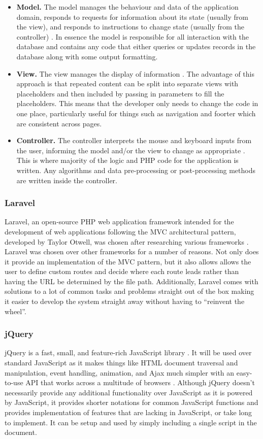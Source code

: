 \begin{itemize}
	\item \textbf{Model.} The model manages the behaviour and data of the application domain, responds to requests for information about its state (usually from the view), and responds to instructions to change state (usually from the controller) \cite{MSDN:MVC}. In essence the model is responsible for all interaction with the database and contains any code that either queries or updates records in the database along with some output formatting.
	\item \textbf{View.} The view manages the display of information \cite{MSDN:MVC}. The advantage of this approach is that repeated content can be split into separate views with placeholders and then included by passing in parameters to fill the placeholders. This means that the developer only needs to change the code in one place, particularly useful for things such as navigation and foorter which are consistent across pages.
	\item \textbf{Controller.} The controller interprets the mouse and keyboard inputs from the user, informing the model and/or the view to change as appropriate \cite{MSDN:MVC}. This is where majority of the logic and PHP code for the application is written. Any algorithms and data pre-processing or post-processing methods are written inside the controller.
\end{itemize}

\subsubsection{Laravel}
Laravel, an open-source PHP web application framework intended for the development of web applications following the MVC architectural pattern, developed by Taylor Otwell, was chosen after researching various frameworks \cite{Laravel:Home}. Laravel was chosen over other frameworks for a number of reasons. Not only does it provide an implementation of the MVC pattern, but it also allows allows the user to define custom routes and decide where each route leads rather than having the URL be determined by the file path. Additionally, Laravel comes with solutions to a lot of common tasks and problems straight out of the box making it easier to develop the system straight away without having to ``reinvent the wheel''.

\subsubsection{jQuery} 
jQuery is a fast, small, and feature-rich JavaScript library \cite{jQuery:Home}. It will be used over standard JavaScript as it makes things like HTML document traversal and manipulation, event handling, animation, and Ajax much simpler with an easy-to-use API that works across a multitude of browsers \cite{jQuery:Home}. Although jQuery doesn't necessarily provide any additional functionality over JavaScript as it is powered by JavaScript, it provides shorter notations for common JavaScript functions and provides implementation of features that are lacking in JavaScript, or take long to implement. It can be setup and used by simply including a single script in the document.

